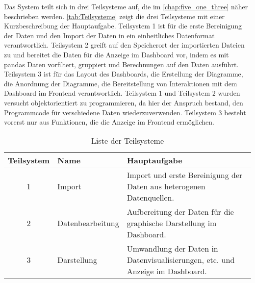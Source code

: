     Das System teilt sich in drei Teilsysteme auf, die im \autoref{chap:five_one_three} näher beschrieben werden. 
    \autoref{tab:Teilsysteme} zeigt die drei Teilsysteme mit einer Kurzbeschreibung der Hauptaufgabe.
    Teilsystem 1 ist für die erste Bereinigung der Daten und den Import der Daten in ein einheitliches Datenformat verantwortlich. 
    Teilsystem 2 greift auf den Speicherort der importierten Dateien zu und bereitet die Daten für die Anzeige im Dashboard vor, 
    indem es mit pandas Daten vorfiltert, gruppiert und Berechnungen auf den Daten ausführt. Teilsystem 3 ist für das Layout des Dashboards, 
    die Erstellung der Diagramme, die Anordnung der Diagramme, die Bereitstellung von Interaktionen mit dem Dashboard im Frontend
    verantwortlich. Teilsystem 1 und Teilsystem 2 wurden versucht objektorientiert zu programmieren, da hier der Anspruch bestand, den Programmcode
    für verschiedene Daten wiederzuverwenden. Teilsystem 3 besteht vorerst nur aus Funktionen, die die Anzeige im Frontend ermöglichen.

       \begingroup
            \setlength{\tabcolsep}{4pt} %
            \renewcommand{\arraystretch}{1.5}
            \begin{table}[h]
                \centering
                \begin{adjustbox}{max width=\textwidth}
                \Huge
                \begin{tabular}{cll}
                   \toprule
                   \textbf{Teilsystem}             & Name   &{Hauptaufgabe} \\
                   \midrule     
                            1                      &Import  &Import und erste Bereinigung der Daten aus heterogenen Datenquellen.\\
                            2                      &Datenbearbeitung     &Aufbereitung der Daten für die graphische Darstellung im Dashboard.\\
                            3                      &Darstellung          &Umwandlung der Daten in Datenvisualisierungen, etc. und Anzeige im Dashboard.\\

                    \bottomrule
                \end{tabular}
                \end{adjustbox}
                \caption{%
                    Liste der Teilsysteme
                \label{tab:Teilsysteme}
                }
                 \end{table}
            \endgroup
    

